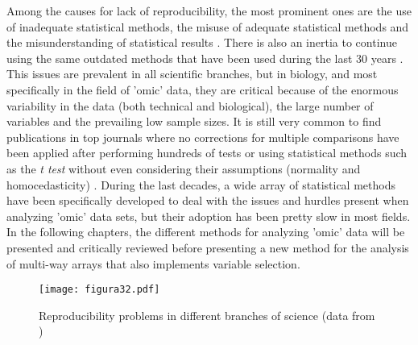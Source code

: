 Among the causes for lack of reproducibility, the most prominent ones are the use of inadequate statistical methods, the misuse of adequate statistical methods and the misunderstanding of statistical results \parencite{ioannidis2017statistical, gagnier2017misconceptions, diong2018poor}. There is also an inertia to continue using the same outdated methods that have been used during the last 30 years \parencite{leek2017five}. This issues are prevalent in all scientific branches, but in biology, and most specifically in the field of 'omic' data, they are critical because of the enormous variability in the data (both technical and biological), the large number of variables and the prevailing low sample sizes. It is still very common to find publications in top journals where no corrections for multiple comparisons have been applied after performing hundreds of tests or using statistical methods such as the \textit{t test} without even considering their assumptions (normality and homocedasticity) \parencite{marino2014use, eklund2016cluster}. During the last decades, a wide array of statistical methods have been specifically developed to deal with the issues and hurdles present when analyzing 'omic' data sets, but their adoption has been pretty slow in most fields. In the following chapters, the different methods for analyzing 'omic' data will be presented and critically reviewed before presenting a new method for the analysis of multi-way arrays that also implements variable selection.

\begin{figure}[hbtp]
	\centering
\texttt{[image: figura32.pdf]}
\caption{Reproducibility problems in different branches of science (data from \cite{baker20161})}
\label{figura32}
\end{figure}

